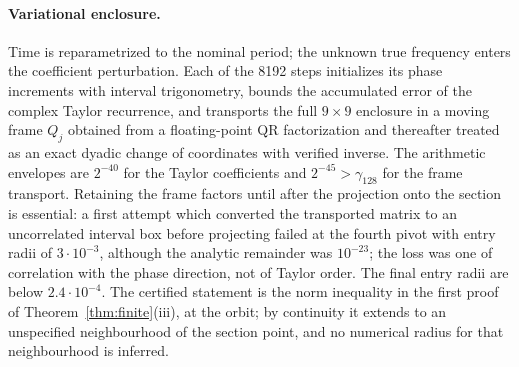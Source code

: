 \documentclass[11pt,a4paper]{article}
\theoremstyle{plain}
\theoremstyle{definition}
\theoremstyle{remark}
\begin{document}
\paragraph{Variational enclosure.} Time is reparametrized to the nominal period; the unknown true frequency enters the coefficient perturbation. Each of the 8192 steps initializes its phase increments with interval trigonometry, bounds the accumulated error of the complex Taylor recurrence, and transports the full $9\times9$ enclosure in a moving frame $Q_j$ obtained from a floating-point QR factorization and thereafter treated as an exact dyadic change of coordinates with verified inverse. The arithmetic envelopes are $2^{-40}$ for the Taylor coefficients and $2^{-45}>\gamma_{128}$ for the frame transport. Retaining the frame factors until after the projection onto the section is essential: a first attempt which converted the transported matrix to an uncorrelated interval box before projecting failed at the fourth pivot with entry radii of $3\cdot10^{-3}$, although the analytic remainder was $10^{-23}$; the loss was one of correlation with the phase direction, not of Taylor order. The final entry radii are below $2.4\cdot10^{-4}$. The certified statement is the norm inequality in the first proof of Theorem~\ref{thm:finite}(iii), at the orbit; by continuity it extends to an unspecified neighbourhood of the section point, and no numerical radius for that neighbourhood is inferred.



\end{document}
